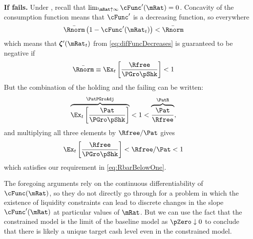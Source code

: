 \documentclass[BufferStockTheory]{subfiles}
\begin{document}
\textbf{If {\RIC} fails.}
Under \cncl{\RIC}, recall that $\lim_{\mRat \uparrow \infty} \cFunc^{\prime}(\mRat) = 0$.  Concavity of the consumption function means that $\cFunc^{\prime}$ is a decreasing function, so everywhere 
\begin{align*}
  \bar{\Rnorm}\left(1-\cFunc^{\prime}({\mRat}_t)\right) & < \bar{\Rnorm}
\end{align*}
which means that $\difFunc^{\prime}(\mRat_{t})$ from \eqref{eq:difFuncDecreases} is guaranteed to be negative if
\begin{align}
  \bar{\Rnorm} \equiv \Ex_{t}\left[\frac{\Rfree}{\PGro \pShk}\right] & < 1  \label{eq:RbarBelowOne}
\end{align}
But the combination of the {\GIC} holding and the {\RIC} failing can be written:
\begin{align*}
  \overbrace{\Ex_{t}\left[\frac{\Pat}{\PGro \pShk}\right]}^{\PatPGroAdj} & < 1 < \overbrace{\frac{\Pat}{\Rfree}}^{{\PatR}},
\end{align*}
and multiplying all three elements by $\Rfree/\Pat$ gives 
\begin{align*}
  \Ex_{t}\left[\frac{\Rfree}{\PGro \pShk}\right] & < \Rfree/\Pat < 1
\end{align*}
which satisfies our requirement in \eqref{eq:RbarBelowOne}.




The foregoing arguments rely on the continuous differentiability of
$\cFunc(\mRat)$, so they do not directly go through for %
a problem in which the existence of liquidity constraints can lead to discrete changes in the slope
$\cFunc^{\prime}(\mRat)$ at particular values of $\mRat$. But we can
use the fact that the constrained model is the limit of the baseline
model as $\pZero \downarrow 0$ to conclude that there is likely a
unique target cash level even in the constrained model.
\end{document}
